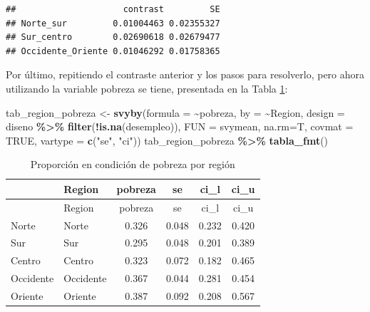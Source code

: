 \documentclass[
  spanish,
  12pt,
]{book}
\newenvironment{Shaded}{\begin{snugshade}}{\end{snugshade}}
\newcommand{\AttributeTok}[1]{\textcolor[rgb]{0.13,0.29,0.53}{#1}}
\newcommand{\ConstantTok}[1]{\textcolor[rgb]{0.56,0.35,0.01}{#1}}
\newcommand{\FunctionTok}[1]{\textcolor[rgb]{0.13,0.29,0.53}{\textbf{#1}}}
\newcommand{\NormalTok}[1]{#1}
\newcommand{\OtherTok}[1]{\textcolor[rgb]{0.56,0.35,0.01}{#1}}
\newcommand{\SpecialCharTok}[1]{\textcolor[rgb]{0.81,0.36,0.00}{\textbf{#1}}}
\newcommand{\StringTok}[1]{\textcolor[rgb]{0.31,0.60,0.02}{#1}}
\begin{document}
\begin{verbatim}
##                     contrast         SE
## Norte_sur         0.01004463 0.02355327
## Sur_centro        0.02690618 0.02679477
## Occidente_Oriente 0.01046292 0.01758365
\end{verbatim}

Por último, repitiendo el contraste anterior y los pasos para resolverlo, pero ahora utilizando la variable pobreza se tiene, presentada en la Tabla \ref{tab:tab-svyby-pobreza-region}:

\begin{Shaded}
\begin{Highlighting}[]
\NormalTok{tab\_region\_pobreza }\OtherTok{\textless{}{-}} \FunctionTok{svyby}\NormalTok{(}\AttributeTok{formula =} \SpecialCharTok{\textasciitilde{}}\NormalTok{pobreza, }\AttributeTok{by =} \SpecialCharTok{\textasciitilde{}}\NormalTok{Region,}
                            \AttributeTok{design =}\NormalTok{ diseno }\SpecialCharTok{\%\textgreater{}\%} \FunctionTok{filter}\NormalTok{(}\SpecialCharTok{!}\FunctionTok{is.na}\NormalTok{(desempleo)),}
                            \AttributeTok{FUN =}\NormalTok{ svymean, }\AttributeTok{na.rm=}\NormalTok{T, }\AttributeTok{covmat =} \ConstantTok{TRUE}\NormalTok{,}
                            \AttributeTok{vartype =} \FunctionTok{c}\NormalTok{(}\StringTok{"se"}\NormalTok{, }\StringTok{"ci"}\NormalTok{))}
\NormalTok{tab\_region\_pobreza }\SpecialCharTok{\%\textgreater{}\%}
  \FunctionTok{tabla\_fmt}\NormalTok{()}
\end{Highlighting}
\end{Shaded}

\begin{longtable}[]{@{}llcccc@{}}
\caption{\label{tab:tab-svyby-pobreza-region}Proporción en condición de pobreza por región}\tabularnewline
\toprule\noalign{}
& Region & pobreza & se & ci\_l & ci\_u \\
\midrule\noalign{}
\endfirsthead
\toprule\noalign{}
& Region & pobreza & se & ci\_l & ci\_u \\
\midrule\noalign{}
\endhead
\bottomrule\noalign{}
\endlastfoot
Norte & Norte & 0.326 & 0.048 & 0.232 & 0.420 \\
Sur & Sur & 0.295 & 0.048 & 0.201 & 0.389 \\
Centro & Centro & 0.323 & 0.072 & 0.182 & 0.465 \\
Occidente & Occidente & 0.367 & 0.044 & 0.281 & 0.454 \\
Oriente & Oriente & 0.387 & 0.092 & 0.208 & 0.567 \\
\end{longtable}
\end{document}
